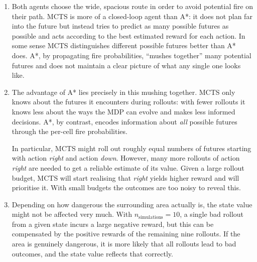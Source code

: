 \documentclass{64110}
\begin{document}
\begin{enumerate}
\begin{enumerate}
\item[(i)]
Both agents choose the wide, spacious route in order to avoid potential fire on their
path. MCTS is more of a closed-loop agent than A*: it does not plan far into the future
but instead tries to predict as many possible futures as possible and acts according to
the best estimated reward for each action. In some sense MCTS distinguishes different
possible futures better than A* does. A*, by propagating fire probabilities, ``mushes
together'' many potential futures and does not maintain a clear picture of what any
single one looks like.

\item[(ii)]
The advantage of A* lies precisely in this mushing together. MCTS only knows about the
futures it encounters during rollouts: with fewer rollouts it knows less about the ways
the MDP can evolve and makes less informed decisions. A*, by contrast, encodes
information about \emph{all} possible futures through the per-cell fire probabilities.

In particular, MCTS might roll out roughly equal numbers of futures starting with action
\textit{right} and action \textit{down}. However, many more rollouts of action
\textit{right} are needed to get a reliable estimate of its value. Given a large rollout
budget, MCTS will start realising that \textit{right} yields higher reward and will
prioritise it. With small budgets the outcomes are too noisy to reveal this.

\item[(iii)]
Depending on how dangerous the surrounding area actually is, the state value might not
be affected very much. With $n_{\mathrm{simulations}} = 10$, a single bad rollout from a
given state incurs a large negative reward, but this can be compensated by the positive
rewards of the remaining nine rollouts. If the area is genuinely dangerous, it is more
likely that all rollouts lead to bad outcomes, and the state value reflects that
correctly.

\end{enumerate}

\end{enumerate}
\end{document}
